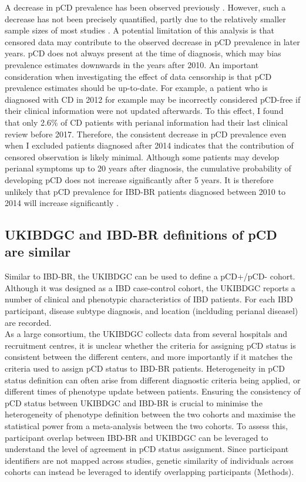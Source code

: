     A decrease in pCD prevalence has been observed previously \cite{Park2019-kj}. However, such a decrease has not been precisely quantified, partly due to the relatively smaller sample sizes of most studies \cite{Brochard2022-kz,Bruckner2018-ag,Gottgens2017-df,Tsai2022-kz}. A potential limitation of this analysis is that censored data may contribute to the observed decrease in pCD prevalence in later years. pCD does not always present at the time of diagnosis, which may bias prevalence estimates downwards in the years after 2010. An important consideration when investigating the effect of data censorship is that pCD prevalence estimates should be up-to-date. For example, a patient who is diagnosed with CD in 2012 for example may be incorrectly considered pCD-free if their clinical information were not updated afterwards. To this effect, I found that only 2.6\% of CD patients with perianal information had their last clinical review before 2017. Therefore, the consistent decrease in pCD prevalence even when I excluded patients diagnosed after 2014 indicates that the contribution of censored observation is likely minimal. Although some patients may develop perianal symptoms up to 20 years after diagnosis, the cumulative probability of developing pCD does not increase significantly after 5 years. It is therefore unlikely that pCD prevalence for IBD-BR patients diagnosed between 2010 to 2014 will increase significantly \cite{Tsai2022-kz}.

    \subsection{UKIBDGC and IBD-BR definitions of pCD are similar}
    Similar to IBD-BR, the UKIBDGC can be used to define a pCD+/pCD- cohort. Although it was designed as a IBD case-control cohort, the UKIBDGC reports a number of clinical and phenotypic characteristics of IBD patients. For each IBD participant, disease subtype diagnosis, and location (inclduding perianal diseasel) are recorded. \\

As a large consortium, the UKIBDGC collects data from several hospitals and recruitment centres, it is unclear whether the criteria for assigning pCD status is consistent between the different centers, and more importantly if it matches the criteria used to assign pCD status to IBD-BR patients. Heterogeneity in pCD status definition can often arise from different diagnostic criteria being applied, or different times of phenotype update between patients. Ensuring the consistency of pCD status between UKIBDGC and IBD-BR is crucial to minimise the heterogeneity of phenotype definition between the two cohorts and maximise the statistical power from a meta-analysis between the two cohorts. 
To assess this, participant overlap between IBD-BR and UKIBDGC can be leveraged to understand the level of agreement in pCD status assignment. Since participant identifiers are not mapped across studies, genetic similarity of individuals across cohorts can instead be leveraged to identify overlapping participants (Methods).\\

